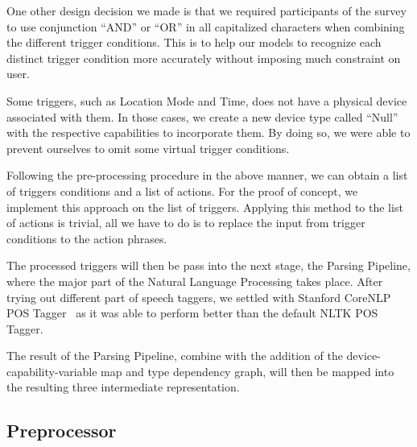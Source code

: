 One other design decision we made is that we required participants of the survey to use conjunction ``AND'' or ``OR'' in all capitalized characters when combining the different trigger conditions. This is to help our models to recognize each distinct trigger condition more accurately without imposing much constraint on user. 

Some triggers, such as Location Mode and Time, does not have a physical device associated with them. In those cases, we create a new device type called ``Null'' with the respective capabilities to incorporate them. By doing so, we were able to prevent ourselves to omit some virtual trigger conditions.

Following the pre-processing procedure in the above manner, we can obtain a list of triggers conditions and a list of actions. For the proof of concept, we implement this approach on the list of triggers. Applying this method to the list of actions is trivial, all we have to do is to replace the input from trigger conditions to the action phrases.

The processed triggers will then be pass into the next stage, the Parsing Pipeline, where the major part of the Natural Language Processing takes place. After trying out different part of speech taggers, we settled with Stanford CoreNLP POS Tagger~\cite{Manning2014} as it was able to perform better than the default NLTK POS Tagger.

The result of the Parsing Pipeline, combine with the addition of the device-capability-variable map and type dependency graph, will then be mapped into the resulting three intermediate representation.



\subsection{Preprocessor}

